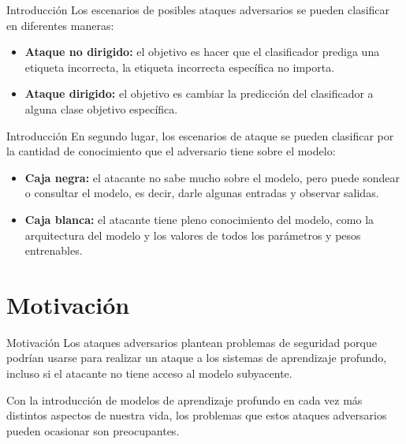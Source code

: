 \documentclass[10pt]{beamer}
\begin{document}
\begin{frame}{Introducción}
\justify
\small
Los escenarios de posibles ataques adversarios se pueden clasificar en diferentes maneras:

\begin{itemize}
\item \textbf{Ataque no dirigido:} el objetivo es hacer que el clasificador prediga una etiqueta incorrecta, la etiqueta incorrecta específica no importa.

\item \textbf{Ataque dirigido:} el objetivo es cambiar la predicción del clasificador a alguna clase objetivo específica.
\end{itemize}

\end{frame}

\begin{frame}{Introducción}
\justify
\small
En segundo lugar, los escenarios de ataque se pueden clasificar por la cantidad de conocimiento que el adversario tiene sobre el modelo:

\begin{itemize}
\item \textbf{Caja negra:} el atacante no sabe mucho sobre el modelo, pero puede sondear o consultar el modelo, es decir, darle algunas entradas y observar salidas.

\item \textbf{Caja blanca:} el atacante tiene pleno conocimiento del modelo, como la arquitectura del modelo y los valores de todos los parámetros y pesos entrenables.
\end{itemize}

\end{frame}


\section{Motivación}
\begin{frame}{Motivación}
\justify
\small
Los ataques adversarios plantean problemas de seguridad porque podrían usarse para realizar un ataque a los sistemas de aprendizaje profundo, incluso si el atacante no tiene acceso al modelo subyacente. \medskip

Con la introducción de modelos de aprendizaje profundo en cada vez más distintos aspectos de nuestra vida, los problemas que estos ataques adversarios pueden ocasionar son preocupantes.

\end{frame}
\end{document}
